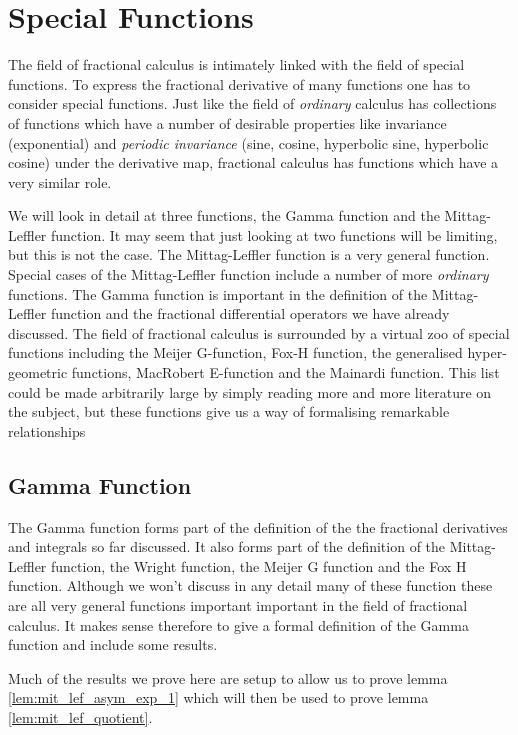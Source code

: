 
\section{Special Functions}

The field of fractional calculus is intimately linked with the field of special functions. To express the fractional derivative
of many functions one has to consider special functions. Just like the field of \emph{ordinary} calculus has collections of functions which have a number of desirable properties like invariance (exponential) and \emph{periodic invariance} (sine, cosine, hyperbolic sine, hyperbolic cosine) under the derivative map, fractional calculus has functions which have a very similar role.

We will look in detail at three functions, the Gamma function and the Mittag-Leffler function. It may seem that just looking at two functions will be limiting, but this is not the case. The Mittag-Leffler function is a very general function. Special cases of the Mittag-Leffler function include a number of more \emph{ordinary} functions. The Gamma function is important in the definition of the Mittag-Leffler function and the fractional differential operators we have already discussed. The field of fractional calculus is surrounded by a virtual zoo of special functions including the Meijer G-function, Fox-H function, the generalised hyper-geometric functions, MacRobert E-function and the Mainardi function. This list could be made arbitrarily large by simply reading more and more literature on the subject, but these functions give us a way of formalising remarkable relationships \cite{Gorenflo2014,Podlubny1999,Srivastava2001, Samko1993,Fox1961}

\subsection{Gamma Function}

The Gamma function forms part of the definition of the the fractional derivatives and integrals so far discussed. It also forms part of the definition of the Mittag-Leffler function, the Wright function, the Meijer G function and the Fox H function. Although we won't discuss in any detail many of these function these are all very general functions important important in the field of fractional calculus. It makes sense therefore to give a formal definition of the Gamma function and include some results.

Much of the results we prove here are setup to allow us to prove lemma \ref{lem:mit_lef_asym_exp_1} which will then be used to prove lemma \ref{lem:mit_lef_quotient}. 


